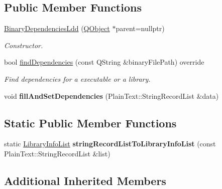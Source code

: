 \subsection*{Public Member Functions}
\begin{DoxyCompactItemize}
\item 
\hyperlink{class_mdt_1_1_deploy_utils_1_1_binary_dependencies_ldd_a2c033911e76b53cd89ecfcb4d91dcf10}{Binary\+Dependencies\+Ldd} (\hyperlink{class_q_object}{Q\+Object} $\ast$parent=nullptr)
\begin{DoxyCompactList}\small\item\em Constructor. \end{DoxyCompactList}\item 
bool \hyperlink{class_mdt_1_1_deploy_utils_1_1_binary_dependencies_ldd_a2e707c35408525ee49a0084ed1ee0555}{find\+Dependencies} (const Q\+String \&binary\+File\+Path) override
\begin{DoxyCompactList}\small\item\em Find dependencies for a executable or a library. \end{DoxyCompactList}\item 
void {\bfseries fill\+And\+Set\+Dependencies} (Plain\+Text\+::\+String\+Record\+List \&data)\hypertarget{class_mdt_1_1_deploy_utils_1_1_binary_dependencies_ldd_a61c12cac53a5031c6e5b67c0f5ea6268}{}\label{class_mdt_1_1_deploy_utils_1_1_binary_dependencies_ldd_a61c12cac53a5031c6e5b67c0f5ea6268}

\end{DoxyCompactItemize}
\subsection*{Static Public Member Functions}
\begin{DoxyCompactItemize}
\item 
static \hyperlink{class_mdt_1_1_deploy_utils_1_1_library_info_list}{Library\+Info\+List} {\bfseries string\+Record\+List\+To\+Library\+Info\+List} (const Plain\+Text\+::\+String\+Record\+List \&list)\hypertarget{class_mdt_1_1_deploy_utils_1_1_binary_dependencies_ldd_a94e4fe56032bee19342f94aa155616d3}{}\label{class_mdt_1_1_deploy_utils_1_1_binary_dependencies_ldd_a94e4fe56032bee19342f94aa155616d3}

\end{DoxyCompactItemize}
\subsection*{Additional Inherited Members}


